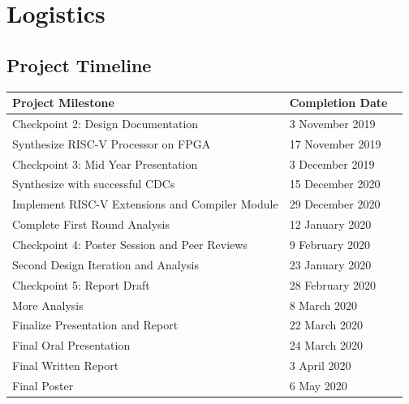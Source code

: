 \documentclass[11pt, oneside]{article}      %
\begin{document}
\section{Logistics}
\subsection{Project Timeline}

\begin{center}
\begin{tabular}{ |m{0.7\linewidth}|m{0.3\linewidth}|}
    \hline
    \textbf{Project Milestone}                                      & \textbf{Completion Date} \\
    \hline
    Checkpoint 2: Design Documentation                              & 3 November 2019 \\
    \hline
    Synthesize RISC-V Processor on FPGA                         & 17 November 2019\\
    \hline
    Checkpoint 3: Mid Year Presentation                             & 3 December 2019 \\
    \hline
    Synthesize with successful \ac{CDC}s                           & 15 December 2020 \\
    \hline
    Implement RISC-V Extensions and Compiler Module                                & 29 December 2020 \\
    \hline
    Complete First Round Analysis                                   & 12 January 2020 \\
    \hline
    Checkpoint 4: Poster Session and Peer Reviews               & 9 February 2020 \\
    \hline
    Second Design Iteration and Analysis                            & 23 January 2020 \\
    \hline
    Checkpoint 5: Report Draft                                      & 28 February 2020 \\
    \hline
    More Analysis                            & 8 March 2020 \\
    \hline
    Finalize Presentation and Report                            & 22 March 2020 \\
    \hline
    Final Oral Presentation                                         & 24 March 2020 \\
    \hline
    Final Written Report                                            & 3 April 2020 \\
    \hline
    Final Poster                                                    & 6 May 2020 \\
    \hline
    
\end{tabular}
\end{center}
\end{document}
